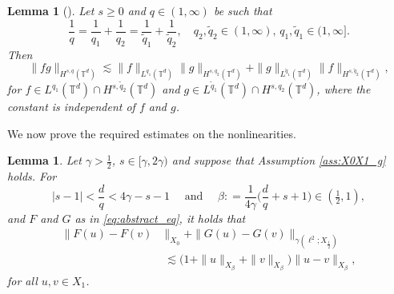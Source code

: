 \documentclass[11pt, a4paper,oneside, reqno]{amsart}
\newtheorem{lemma}[theorem]{Lemma}
\theoremstyle{remark} %
\theoremstyle{definition} %
\numberwithin{theorem}{section}
\numberwithin{equation}{section}
\newcommand{\T}{\mathbb{T}}
\newcommand{\half}{\frac{1}{2}}
\newcommand{\gam}{\gamma}
\renewcommand{\tilde}[1]{\widetilde{#1}}
\begin{document}
\begin{lemma}[{\cite[Proposition 2.1.1]{Ta00}}]\label{lem:paraproduct}
    Let $s\geq 0$ and $q\in(1,\infty)$ be such that 
    \begin{equation*}
        \frac{1}{q} = \frac{1}{q_1}+\frac{1}{q_2}= \frac{1}{\tilde{q}_1}+\frac{1}{\tilde{q}_2},\quad q_2, \tilde{q}_2\in (1,\infty),\, q_1,\tilde{q}_1\in (1,\infty].
    \end{equation*}
    Then
    \begin{equation*}
        \| fg \|_{H^{s,q}(\T^d)}\lesssim \|f\|_{L^{q_1}(\T^d)}\|g\|_{H^{s,q_2}(\T^d)} + \|g\|_{L^{\tilde{q}_1}(\T^d)}\|f\|_{H^{s, \tilde{q}_2}(\T^d)}, 
    \end{equation*}
    for $f\in L^{q_1}(\T^d)\cap H^{s, \tilde{q}_2}(\T^d)$ and $ g\in L^{\tilde{q}_1}(\T^d) \cap H^{s,q_2}(\T^d)$, where the constant is independent of $f$ and $g$.
\end{lemma}
We now prove the required estimates on the nonlinearities.
\begin{lemma} \label{lem:LWP_estimates}
Let $\gam>\half$, $s\in [\gam, 2\gam)$ and suppose that Assumption \ref{ass:X0X1_g} holds. For 
        \begin{equation*}
        |s-1|<\frac dq< 4\gam-s-1\quad \text{ and }\quad \beta: = \frac{1}{4\gam}\big(\frac{d}{q}+s+1\big)\in (\tfrac 12,1),
    \end{equation*}
    and $F$ and $G$ as in \eqref{eq:abstract_eq}, it holds that 
    \begin{align*}
        \|F(u)-F(v)&\|_{X_0}+\|G(u)-G(v)\|_{\gam(\ell^2; X_\half)}\\
       &\; \lesssim \big(1+ \|u\|_{X_\beta}+ \|v\|_{X_\beta}\big)\|u-v\|_{X_\beta},
    \end{align*}
    for all $u,v\in X_1$.
\end{lemma}
\end{document}
